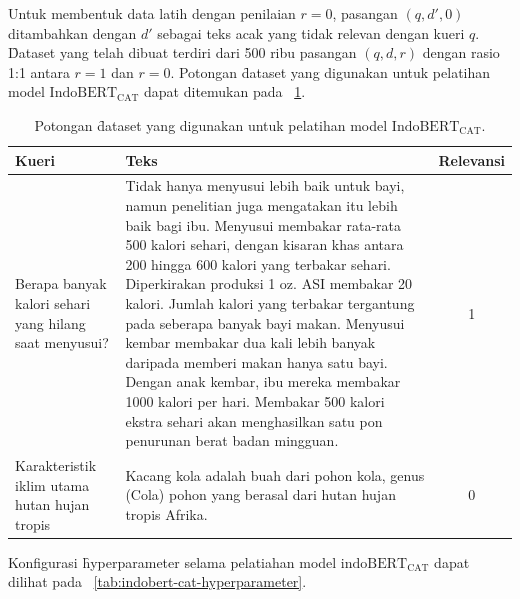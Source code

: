 Untuk membentuk data latih dengan penilaian $r=0$, pasangan $(q, d',0)$ ditambahkan dengan $d'$ sebagai teks acak yang tidak relevan dengan kueri $q$. \f{Dataset} yang telah dibuat terdiri dari 500 ribu pasangan $(q, d, r)$ dengan rasio 1:1 antara $r=1$ dan $r=0$. Potongan \f{dataset} yang digunakan untuk pelatihan model $\text{IndoBERT}_{\text{CAT}}$ dapat ditemukan pada \tab~\ref{tab:contoh-indobert-cat-data}.
\begin{table}
    \centering
    \caption{Potongan \f{dataset} yang digunakan untuk pelatihan model $\text{IndoBERT}_{\text{CAT}}$.}
    \label{tab:contoh-indobert-cat-data}
    \begin{tabular}{|p{2cm}|p{7cm}|c|} \hline
        \textbf{Kueri}                                         & \textbf{Teks}                                                                                                                                                                                                                                                                                                                                                                                                                                                                                                                                                                                          & \textbf{Relevansi} \\ \hline
        Berapa banyak kalori sehari yang hilang saat menyusui? & Tidak hanya menyusui lebih baik untuk bayi, namun penelitian juga mengatakan itu lebih baik bagi ibu. Menyusui membakar rata-rata 500 kalori sehari, dengan kisaran khas antara 200 hingga 600 kalori yang terbakar sehari. Diperkirakan produksi 1 oz. ASI membakar 20 kalori. Jumlah kalori yang terbakar tergantung pada seberapa banyak bayi makan. Menyusui kembar membakar dua kali lebih banyak daripada memberi makan hanya satu bayi. Dengan anak kembar, ibu mereka membakar 1000 kalori per hari. Membakar 500 kalori ekstra sehari akan menghasilkan satu pon penurunan berat badan mingguan. & 1                  \\ \hline
        Karakteristik iklim utama hutan hujan tropis           & Kacang kola adalah buah dari pohon kola, genus (Cola) pohon yang berasal dari hutan hujan tropis Afrika. & 0                  \\ \hline
    \end{tabular}
\end{table}

Konfigurasi \f{hyperparameter} selama pelatiahan model $\text{indoBERT}_{\text{CAT}}$ dapat  dilihat pada \tab~\ref{tab:indobert-cat-hyperparameter}.

